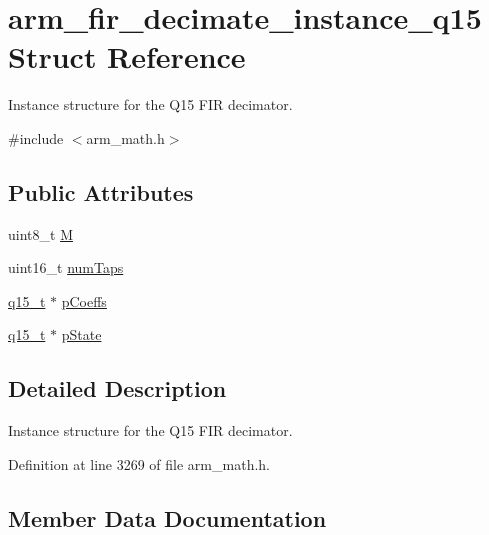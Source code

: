 \hypertarget{structarm__fir__decimate__instance__q15}{}\section{arm\+\_\+fir\+\_\+decimate\+\_\+instance\+\_\+q15 Struct Reference}
\label{structarm__fir__decimate__instance__q15}


Instance structure for the Q15 F\+IR decimator.  




{\ttfamily \#include $<$arm\+\_\+math.\+h$>$}

\subsection*{Public Attributes}
\begin{DoxyCompactItemize}
\item 
uint8\+\_\+t \hyperlink{structarm__fir__decimate__instance__q15_aad9320284218b3aa378527ea518cf093}{M}
\item 
uint16\+\_\+t \hyperlink{structarm__fir__decimate__instance__q15_ac1e9844488ec717da334fbd4c4f41990}{num\+Taps}
\item 
\hyperlink{arm__math_8h_ab5a8fb21a5b3b983d5f54f31614052ea}{q15\+\_\+t} $\ast$ \hyperlink{structarm__fir__decimate__instance__q15_a01cacab67e73945e8289075598ede14d}{p\+Coeffs}
\item 
\hyperlink{arm__math_8h_ab5a8fb21a5b3b983d5f54f31614052ea}{q15\+\_\+t} $\ast$ \hyperlink{structarm__fir__decimate__instance__q15_a3f7b5184bb28853ef401b001df121047}{p\+State}
\end{DoxyCompactItemize}


\subsection{Detailed Description}
Instance structure for the Q15 F\+IR decimator. 

Definition at line 3269 of file arm\+\_\+math.\+h.



\subsection{Member Data Documentation}
\mbox{\label{structarm__fir__decimate__instance__q15_aad9320284218b3aa378527ea518cf093}} 
